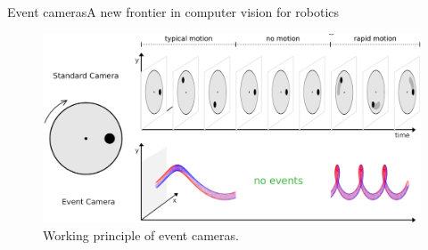 \begin{frame}{Event cameras}{A new frontier in computer vision for robotics}
	\begin{figure}
		\centering
		\includegraphics[width=.76\textwidth]{event_camera_scheme.png}
		\caption{Working principle of event cameras.}
		\label{fig:eventcameraprinciple}
	\end{figure}
\end{frame}

